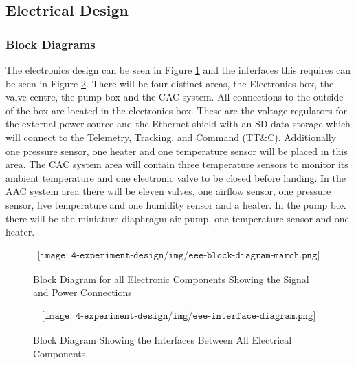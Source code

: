 \pagebreak
\subsection{Electrical Design}

\subsubsection{Block Diagrams}
\begin{centering}
The electronics design can be seen in Figure \ref{fig:electronics-block-diagram} and the interfaces this requires can be seen in Figure \ref{fig:eee-interface-diagram}. There will be four distinct areas, the Electronics box, the valve centre, the pump box and the CAC system. All connections to the outside of the box are located in the electronics box. These are the voltage regulators for the external power source and the Ethernet shield with an SD data storage which will connect to the Telemetry, Tracking, and Command (TT\&C). Additionally one pressure sensor, one heater and one temperature sensor will be placed in this area. The CAC system area will contain three temperature sensors to monitor its ambient temperature and one electronic valve to be closed before landing. In the AAC system area there will be eleven valves, one airflow sensor, one pressure sensor, five temperature and one humidity sensor and a heater. In the pump box there will be the miniature diaphragm air pump, one temperature sensor and one heater.
\end{centering}
\bigskip

\begin{figure}[H]
    \begin{align*}
        \texttt{[image: 4-experiment-design/img/eee-block-diagram-march.png]}
    \end{align*}
    \caption{Block Diagram for all Electronic Components Showing the Signal and Power Connections}\label{fig:electronics-block-diagram}
\end{figure}


\begin{figure}[H]
    \begin{align*}
        \texttt{[image: 4-experiment-design/img/eee-interface-diagram.png]}
    \end{align*}
    \caption{Block Diagram Showing the Interfaces Between All Electrical Components.}\label{fig:eee-interface-diagram}
\end{figure}

